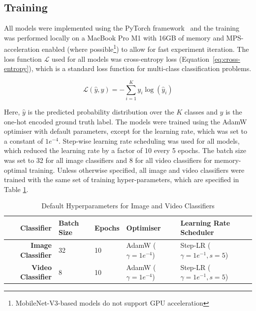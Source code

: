 \documentclass{article}
\begin{document}

  \subsection{Training} %
  \label{sub:training}

  All models were implemented using the PyTorch framework~\cite{pytorch} and the
  training was performed locally on a MacBook Pro M1 with 16GB of memory and
  MPS-acceleration enabled (where possible\footnote{MobileNet-V3-based models do
  not support GPU acceleration}) to allow for fast experiment iteration. The
  loss function $\mathcal{L}$ used for all models was cross-entropy loss
  (Equation~\ref{eq:cross-entropy}), which
  is a standard loss function for multi-class classification problems.

  \begin{equation}
    \mathcal{L}(\hat{y},y) = -\sum_{i=1}^{K} y_i \log(\hat{y}_i)
    \label{eq:cross-entropy}
  \end{equation}

  Here, $\hat{y}$ is the predicted probability distribution over the $K$ classes
  and $y$ is the one-hot encoded ground truth label. The models were trained
  using the AdamW~\cite{adamw} optimiser with default parameters, except for the
  learning rate, which was set to a constant of $1e^{-4}$. Step-wise learning
  rate scheduling was used for all models, which reduced the learning rate by a
  factor of 10 every 5 epochs. The batch size was set to 32 for all image
  classifiers and 8 for all video classifiers for memory-optimal training.
  Unless otherwise specified, all image and video classifiers were trained with
  the same set of training hyper-parameters, which are specified in Table
  \ref{tab:default-hyperparams}. 

  \begin{table}[ht]
    \centering
    \begin{tabular}{rllll}
      \toprule
      Classifier & Batch Size & Epochs & Optimiser & Learning Rate Scheduler \\
      \midrule
      \bfseries Image Classifier & 32 & 10 & AdamW ($\gamma=1e^{-4}$) & Step-LR
      ($\gamma=1e^{-1}, s=5$) \\
      \bfseries Video Classifier & 8 & 10 & AdamW ($\gamma=1e^{-4}$) & Step-LR
      ($\gamma=1e^{-1}, s=5$) \\
      \bottomrule
    \end{tabular}
    \caption{Default Hyperparameters for Image and Video Classifiers}
    \label{tab:default-hyperparams}
  \end{table}
\end{document}
